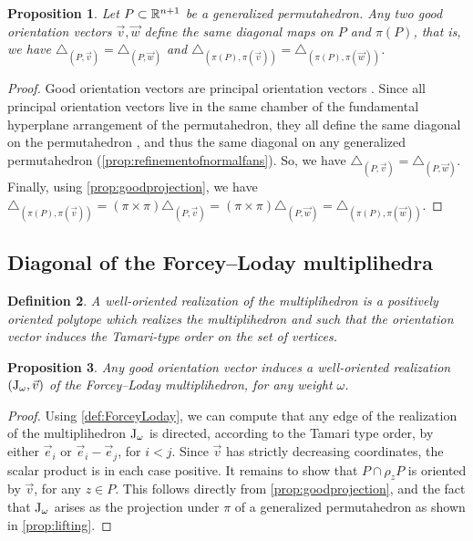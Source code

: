\documentclass[twoside, 11pt]{amsart}
\newtheorem{definition}{Definition}[section]
\newtheorem{proposition}[definition]{Proposition}
\theoremstyle{remark}
\begin{document}
\begin{proposition}
Let $P\subset\mathbb{R}^{n+1}$ be a generalized permutahedron. 
Any two good orientation vectors $\vec v, \vec w$ define the same diagonal maps on $P$ and $\pi(P)$, that is, we have $\triangle_{(P,\vec v)}=\triangle_{(P,\vec w)}$ and $\triangle_{(\pi(P),\pi(\vec v))}=\triangle_{(\pi(P),\pi(\vec w))}$.
\end{proposition}
\begin{proof}
Good orientation vectors are principal orientation vectors \cite[Definition 3.15]{LA21}. Since all principal orientation vectors live in the same chamber of the fundamental hyperplane arrangement of the permutahedron, they all define the same diagonal on the permutahedron \cite[Proposition 1.21]{LA21}, and thus the same diagonal on any generalized permutahedron (\cref{prop:refinementofnormalfans}). So, we have $\triangle_{(P,\vec v)}=\triangle_{(P,\vec w)}$. Finally, using \cref{prop:goodprojection}, we have $\triangle_{(\pi(P),\pi(\vec v))}=(\pi \times \pi)\triangle_{(P,\vec v)}=(\pi \times \pi)\triangle_{(P,\vec w)}=\triangle_{(\pi(P),\pi(\vec w))}$. 
\end{proof}

\subsection{Diagonal of the Forcey--Loday multiplihedra}
\label{sec:diagonal}

\begin{definition}
A \emph{well-oriented realization of the multiplihedron} is a positively oriented polytope which realizes the multiplihedron and such that the orientation vector induces the Tamari-type order on the set of vertices. 
\end{definition}

\begin{proposition}
\label{prop:OrientationVector}
Any good orientation vector induces a well-oriented realization $\left( \mathrm{J}_\omega, \vec v \right)$ of the Forcey--Loday multiplihedron, for any weight $\omega$. 
\end{proposition}

\begin{proof}
Using \cref{def:ForceyLoday}, we can compute that any edge of the realization of the multiplihedron $\mathrm{J}_\omega$ is directed, according to the Tamari type order, by either $\vec e_i$ or $\vec e_i-\vec e_j$, for $i<j$.
Since $\vec v$ has strictly decreasing coordinates, the scalar product is in each case positive. 
It remains to show that $P\cap\rho_z P$ is oriented by $\vec v$, for any $z \in P$. 
This follows directly from \cref{prop:goodprojection}, and the fact that $\mathrm{J}_\omega$ arises as the projection under $\pi$ of a generalized permutahedron as shown in  \cref{prop:lifting}.
\end{proof}
\end{document}
